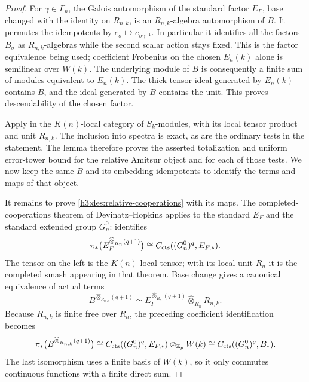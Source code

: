 \begin{proof}
For \(\gamma\in\Gamma_n\), the Galois automorphism of the standard
factor \(E_F\), base changed with the identity on \(R_{n,k}\), is an
\(R_{n,k}\)-algebra automorphism of \(B\).  It permutes the idempotents
by \(e_\sigma\mapsto e_{\sigma\gamma^{-1}}\).  In particular it
identifies all the factors \(B_\sigma\) as \(R_{n,k}\)-algebras while
the second scalar action stays fixed.  This is the factor equivalence
being used; coefficient Frobenius on the chosen \(E_n(k)\) alone is
semilinear over \(W(k)\).  The underlying module of \(B\) is consequently
a finite sum of modules equivalent to \(E_n(k)\).  The thick tensor
ideal generated by \(E_n(k)\) contains \(B\), and the ideal generated
by \(B\) contains the unit.  This proves descendability of the chosen
factor.

Apply  in the \(K(n)\)-local category of
\(S_k\)-modules, with its local tensor product and unit \(R_{n,k}\).
The inclusion into spectra is exact, as are the ordinary tests in the
statement.  The lemma therefore proves the asserted totalization and
uniform error-tower bound for the relative Amitsur object and for each
of those tests.  We now keep the same \(B\) and its embedding
idempotents to identify the terms and maps of that object.

It remains to prove \eqref{h3:des:relative-cooperations} with its
maps.  The completed-cooperations theorem of Devinatz--Hopkins applies
to the standard \(E_F\) and the standard extended group \(G_n^0\):
\cite[Proposition~2.2 and formulas~(2.5)--(2.7)]{DevinatzHopkins}
identifies
\[
 \pi_*\bigl(E_F^{\widehat\otimes_{R_n}(q+1)}\bigr)
     \cong C_{\mathrm{cts}}((G_n^0)^q,E_{F,*}).
\]
The tensor on the left is the \(K(n)\)-local tensor; with its local
unit \(R_n\) it is the completed smash appearing in that theorem.
Base change gives a canonical equivalence of actual terms
\[
 B^{\widehat\otimes_{R_{n,k}}(q+1)}
 \simeq
 E_F^{\widehat\otimes_{R_n}(q+1)}
       \widehat\otimes_{R_n}R_{n,k}.
\]
Because \(R_{n,k}\) is finite free over \(R_n\), the preceding
coefficient identification becomes
\begin{equation}\label{h3:des:basechanged-cooperations}
 \pi_*\bigl(B^{\widehat\otimes_{R_{n,k}}(q+1)}\bigr)
 \cong C_{\mathrm{cts}}((G_n^0)^q,E_{F,*})\otimes_{\mathbb Z_p}W(k)
 \cong C_{\mathrm{cts}}((G_n^0)^q,B_*).
\end{equation}
The last isomorphism uses a finite basis of \(W(k)\), so it only
commutes continuous functions with a finite direct sum.


\end{proof}
